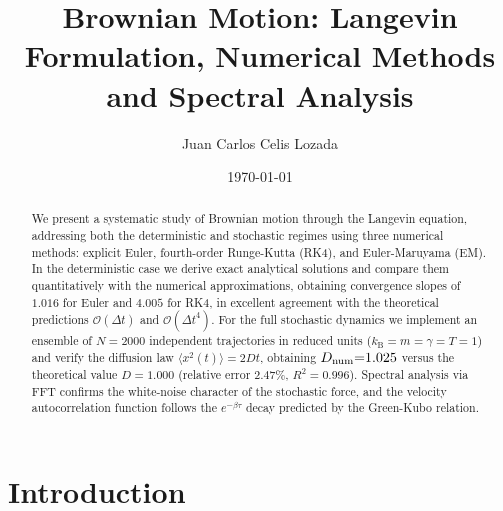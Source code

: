 \documentclass[aps,prl,twocolumn,showpacs,superscriptaddress,longbibliography]{revtex4-2}
\newcommand{\kB}{k_{\mathrm{B}}}
\newcommand{\MSD}{\langle x^2(t) \rangle}
\newcommand{\dt}{\Delta t}
\begin{document}
\title{Brownian Motion: Langevin Formulation,
	Numerical Methods and Spectral Analysis}

\author{Juan Carlos Celis Lozada}

\date{\today}

\begin{abstract}
	We present a systematic study of Brownian motion through the Langevin
	equation, addressing both the deterministic and stochastic regimes using
	three numerical methods: explicit Euler, fourth-order Runge-Kutta (RK4),
	and Euler-Maruyama (EM).
	In the deterministic case we derive exact analytical solutions and compare
	them quantitatively with the numerical approximations, obtaining convergence
	slopes of $1.016$ for Euler and $4.005$ for RK4, in excellent agreement
	with the theoretical predictions $\mathcal{O}(\dt)$ and
	$\mathcal{O}(\dt^{4})$.
	For the full stochastic dynamics we implement an ensemble of $N{=}2000$
	independent trajectories in reduced units ($\kB{=}m{=}\gamma{=}T{=}1$)
	and verify the diffusion law $\MSD{=}2Dt$, obtaining
	$D_{\rm num}{=}1.025$ versus the theoretical value $D{=}1.000$
	(relative error $2.47\%$, $R^{2}{=}0.996$).
	Spectral analysis via FFT confirms the white-noise character of the
	stochastic force, and the velocity autocorrelation function follows the
	$e^{-\beta\tau}$ decay predicted by the Green-Kubo relation.
\end{abstract}


\maketitle

\section{Introduction}
\label{sec:intro}
\end{document}
